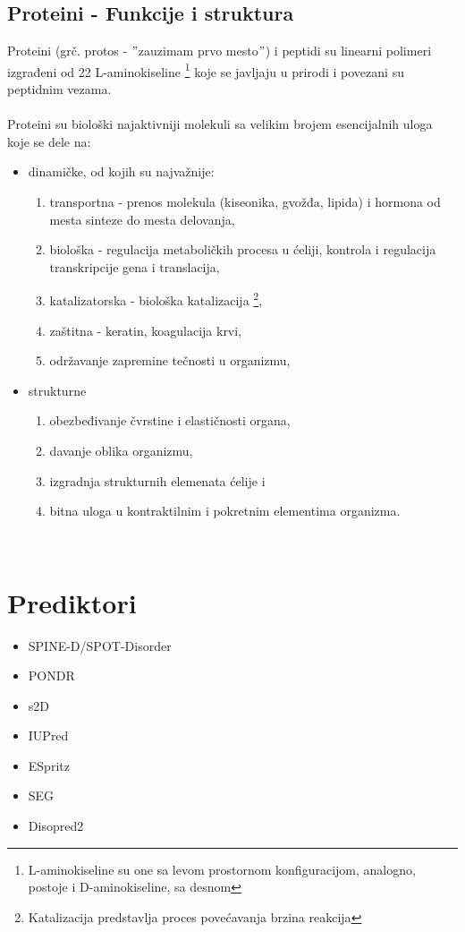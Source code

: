 \documentclass[a4paper]{article}
\begin{document}
\subsection{Proteini - Funkcije i struktura}
\label{sec:proteini}
Proteini (grč. protos - $"$zauzimam prvo mesto$"$) i peptidi su linearni polimeri izgrađeni od 22 L-aminokiseline \footnote{L-aminokiseline su one sa levom prostornom konfiguracijom, analogno, postoje i D-aminokiseline, sa desnom} koje se javljaju u prirodi i povezani su peptidnim vezama. ~\cite{biopathways} \\\\
Proteini su biološki najaktivniji molekuli sa velikim brojem esencijalnih uloga koje se dele na:
\begin{itemize}
\item dinamičke, od kojih su najvažnije:
\begin{enumerate} 
\item transportna - prenos molekula (kiseonika, gvožđa, lipida) i hormona od mesta sinteze do mesta delovanja,
\item biološka - regulacija metaboličkih procesa u ćeliji, kontrola i regulacija transkripcije gena i translacija,
\item katalizatorska - biološka katalizacija \footnote{Katalizacija predstavlja proces povećavanja brzina reakcija},
\item zaštitna - keratin, koagulacija krvi,
\item održavanje zapremine tečnosti u organizmu,
\end{enumerate}
\item strukturne
\begin{enumerate}
\item obezbeđivanje čvrstine i elastičnosti organa,
\item davanje oblika organizmu,
\item izgradnja strukturnih elemenata ćelije i
\item bitna uloga u kontraktilnim i pokretnim elementima organizma.
\end{enumerate}
\end{itemize} 
~\cite{spasic}


\section{Prediktori}
\label{sec:prediktori}
\begin{itemize}
\item SPINE-D/SPOT-Disorder
\item PONDR
\item s2D
\item IUPred
\item ESpritz
\item SEG
\item Disopred2
\end{itemize}
\end{document}
